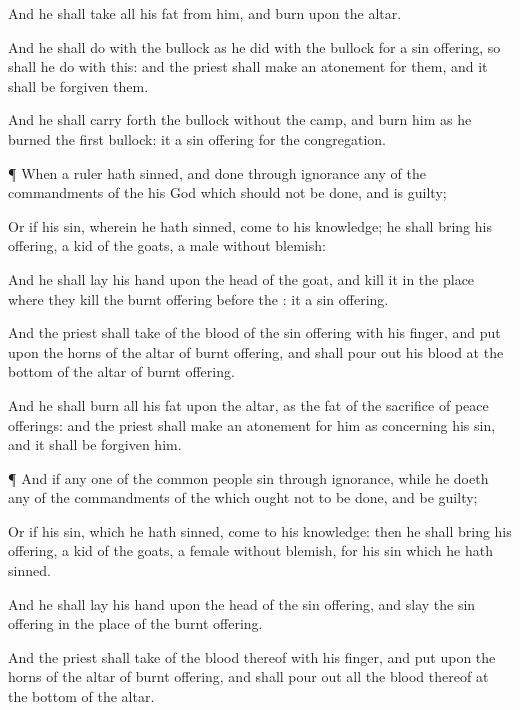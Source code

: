 {And he shall
take all his
fat from him, and
burn
{} upon the
altar.

And he shall
do with the
bullock as he
did with the
bullock for a sin
offering, so shall he
do with this: and the
priest shall make an
atonement for them, and it shall be
forgiven them.

And he shall carry
forth the
bullock
without the
camp, and
burn him as he
burned the
first
bullock: it
{} a sin
offering for the
congregation.


\par }{\PP {}¶ When a
ruler hath
sinned, and
done
{} through
ignorance
{}
any of the
commandments of the
{} his
God
{} which should not be
done, and is
guilty;

Or if his
sin, wherein he hath
sinned, come to his
knowledge; he shall
bring his
offering, a
kid of the
goats, a
male without
blemish:

And he shall
lay his
hand upon the
head of the
goat, and
kill it in the
place where they
kill the burnt
offering
before the
{}: it
{} a sin
offering.

And the
priest shall
take of the
blood of the sin
offering with his
finger, and
put
{} upon the
horns of the
altar of burnt
offering, and shall pour
out his
blood at the
bottom of the
altar of burnt
offering.

And he shall
burn all his
fat upon the
altar, as the
fat of the
sacrifice of peace
offerings: and the
priest shall make an
atonement for him as concerning his
sin, and it shall be
forgiven him.


\par }{\PP {}¶ And if
any
one of the
common
people
sin through
ignorance, while he
doeth
{}
any of the
commandments of the
{}
{} which ought not to be
done, and be
guilty;

Or if his
sin, which he hath
sinned, come to his
knowledge: then he shall
bring his
offering, a
kid of the
goats, a
female without
blemish, for his
sin which he hath
sinned.

And he shall
lay his
hand upon the
head of the sin
offering, and
slay the sin
offering in the
place of the burnt
offering.

And the
priest shall
take of the
blood thereof with his
finger, and
put
{} upon the
horns of the
altar of burnt
offering, and shall pour
out all the
blood thereof at the
bottom of the
altar.

}
